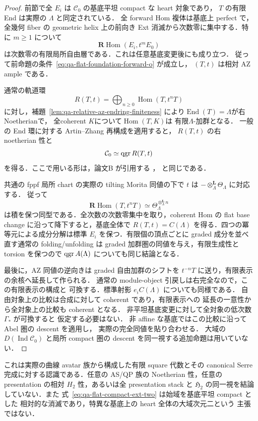 \begin{proof}
前節で全 $E_i$ は $\mathcal C_0$ の基底平坦 compact な heart 対象であり，
$T$ の有限 End は実際の $\Lambda$ と同定されている．
全 forward Hom 複体は基底上 perfect で，全幾何 fiber の geometric helix
上の前向き Ext 消滅から次数零に集中する．特に $m\geq1$ について
\[
 \mathbf R\operatorname{Hom}(E_i,t^mE_0)
\]
は次数零の有限局所自由層である．これは任意基底変更後にも成り立つ．
従って前命題の条件~\eqref{eq:qa-flat-foundation-forward-o} が成立し，
$(T,t)$ は相対 AZ ample である．

通常の軌道環
\[
 R(T,t)=\bigoplus_{n\geq0}\operatorname{Hom}(T,t^nT)
\]
に対し，補題~\ref{lem:qa-relative-az-endring-finiteness}
により$\operatorname{End}(T)=\Lambda$が右Noetherianで，
全coherent $K$について$\operatorname{Hom}(T,K)$は
有限$\Lambda$-加群となる．
一般の End 環に対する Artin--Zhang 再構成を適用すると，
$R(T,t)$ の右 noetherian 性と
\[
 \mathcal C_0\simeq\operatorname{qgr} R(T,t)
\]
を得る．ここで用いる形は，論文B
\cite[\texttt{prop:relative-h2-antiserre-reconstruction}]{QuadricModuli2026}
が引用する \cite[Theorem 4.5(1)]{AZ1994}，
\cite[Theorem 7.3]{OACU2026} と同じである．

共通の fppf 局所 chart の実際の tilting Morita 同値の下で $t$ は
$-\otimes_\Lambda^{\mathbf L}\Theta_\Lambda$ に対応する．
従って
\[
 \mathbf R\operatorname{Hom}(T,t^nT)
  \simeq \Theta_\Lambda^{\otimes_\Lambda^{\mathbf L}n}
\]
は積を保つ同型である．全次数の次数零集中を取り，coherent Hom の
flat base change に沿って降下すると，基底全体で
$R(T,t)=C(\Lambda)$ を得る．四つの冪等元による成分分解は標準
$E_i$ を保つ．有限個の頂点ごとに graded 成分を並べ直す通常の
folding/unfolding は graded 加群圏の同値を与え，有限生成性と
torsion を保つので $\operatorname{qgr} A(\Lambda)$ についても同じ結論となる．

最後に，AZ 同値の逆向きは graded 自由加群のシフトを
$t^{-n}T$ に送り，有限表示の余核へ延長して作られる．
通常の module-object 引戻しは右完全なので，この有限表示の構成と
可換する．標準射影 $e_iC(\Lambda)$ についても同様である．
自由対象上の比較は合成に対して coherent であり，有限表示への
延長の一意性から全対象上の比較も coherent となる．
非平坦基底変更に対して全対象の低次数 $\Gamma_*$ が可換すると
仮定する必要はない．
非 affine な基底ではこの比較に沿って Abel 圏の descent を適用し，
実際の完全同値を貼り合わせる．
大域の $D(\operatorname{Ind}\mathcal C_0)$ と局所 compact 圏の descent
を同一視する追加命題は用いていない．
\end{proof}

\begin{remark}[結論の範囲]
これは実際の曲線 avatar 族から構成した有限 square 代数とその canonical
Serre 完成に対する認識である．任意の AS/QP 族の Noetherian 性，任意の
presentation の相対 $H_2$ 性，あるいは全 presentation stack と
$\mathfrak H_2$ の同一視を結論していない．また
式~\eqref{eq:qa-flat-compact-ext-two} は始域を基底平坦 compact とした
相対的な消滅であり，特異な基底上の heart 全体の大域次元二という
主張ではない．
\end{remark}
